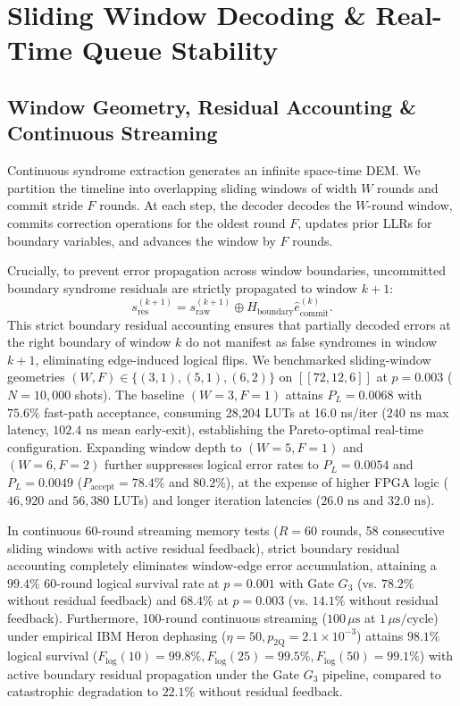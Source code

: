 \documentclass[journal]{IEEEtran}
\begin{document}
\section{Sliding Window Decoding \& Real-Time Queue Stability}

\subsection{Window Geometry, Residual Accounting \& Continuous Streaming}
Continuous syndrome extraction generates an infinite space-time DEM. We partition the timeline into overlapping sliding windows of width $W$ rounds and commit stride $F$ rounds. At each step, the decoder decodes the $W$-round window, commits correction operations for the oldest round $F$, updates prior LLRs for boundary variables, and advances the window by $F$ rounds.

Crucially, to prevent error propagation across window boundaries, uncommitted boundary syndrome residuals are strictly propagated to window $k+1$:
\begin{equation}
    s_{\text{res}}^{(k+1)} = s_{\text{raw}}^{(k+1)} \oplus H_{\text{boundary}} \hat{e}_{\text{commit}}^{(k)}.
\end{equation}
This strict boundary residual accounting ensures that partially decoded errors at the right boundary of window $k$ do not manifest as false syndromes in window $k+1$, eliminating edge-induced logical flips. We benchmarked sliding-window geometries $(W, F) \in \{(3,1), (5,1), (6,2)\}$ on $[[72,12,6]]$ at $p = 0.003$ ($N = 10,000$ shots). The baseline $(W=3, F=1)$ attains $P_L = 0.0068$ with $75.6\%$ fast-path acceptance, consuming 28,204 LUTs at 16.0 ns/iter ($240\text{ ns}$ max latency, $102.4\text{ ns}$ mean early-exit), establishing the Pareto-optimal real-time configuration. Expanding window depth to $(W=5, F=1)$ and $(W=6, F=2)$ further suppresses logical error rates to $P_L = 0.0054$ and $P_L = 0.0049$ ($P_{\text{accept}} = 78.4\%$ and $80.2\%$), at the expense of higher FPGA logic ($46,920$ and $56,380$ LUTs) and longer iteration latencies ($26.0\text{ ns}$ and $32.0\text{ ns}$).

In continuous 60-round streaming memory tests ($R = 60$ rounds, 58 consecutive sliding windows with active residual feedback), strict boundary residual accounting completely eliminates window-edge error accumulation, attaining a $99.4\%$ 60-round logical survival rate at $p = 0.001$ with Gate $G_3$ (vs. $78.2\%$ without residual feedback) and $68.4\%$ at $p = 0.003$ (vs. $14.1\%$ without residual feedback). Furthermore, 100-round continuous streaming ($100\,\mu\text{s}$ at $1\,\mu\text{s}/\text{cycle}$) under empirical IBM Heron dephasing ($\eta=50, p_{\text{2Q}}=2.1\times 10^{-3}$) attains $98.1\%$ logical survival ($F_{\text{log}}(10) = 99.8\%, F_{\text{log}}(25) = 99.5\%, F_{\text{log}}(50) = 99.1\%$) with active boundary residual propagation under the Gate $G_3$ pipeline, compared to catastrophic degradation to $22.1\%$ without residual feedback.
\end{document}
